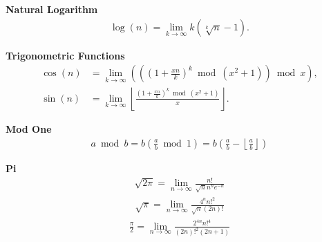 \documentclass[10pt,a4paper]{article}
\theoremstyle{plain}
\newcommand{\floor}[1]{\left\lfloor #1 \right\rfloor}
\begin{document}
\textbf{Natural Logarithm}
\begin{align*}
\log(n) = \lim_{k\rightarrow\infty} k (\sqrt[k]{n}-1) .
\end{align*}

\textbf{Trigonometric Functions}
\begin{align*}
\cos(n) &= \lim_{k\to\infty} \left( \left( \left( 1+\frac{xn}{k} \right)^k \bmod (x^2+1) \right) \bmod x \right) , \\
\sin(n) &= \lim_{k\to\infty} \floor{\frac{\left( 1+\frac{xn}{k} \right)^k \bmod (x^2+1)}{x}} .
\end{align*}

\textbf{Mod One}
\begin{align*}
a \bmod b
= b \left( \frac{a}{b} \bmod 1 \right)
= b \left( \frac{a}{b} - \floor{\frac{a}{b}} \right)
\end{align*}

\textbf{Pi}
\begin{align*}
\sqrt{2\pi} = \lim_{n\rightarrow\infty} \frac{n!}{\sqrt{n}n^n e^{-n}}
\end{align*}
\begin{align*}
\sqrt{\pi} = \lim_{n\rightarrow\infty} \frac{4^n n!^2}{\sqrt{n} (2n)!}
\end{align*}
\begin{align*}
\frac{\pi}{2}
= \lim_{n\rightarrow\infty} \frac{2^{4n} n!^4}{(2n)!^2 (2n+1)}
\end{align*}

\footnotesize

\begingroup
\raggedright


\endgroup
\end{document}
